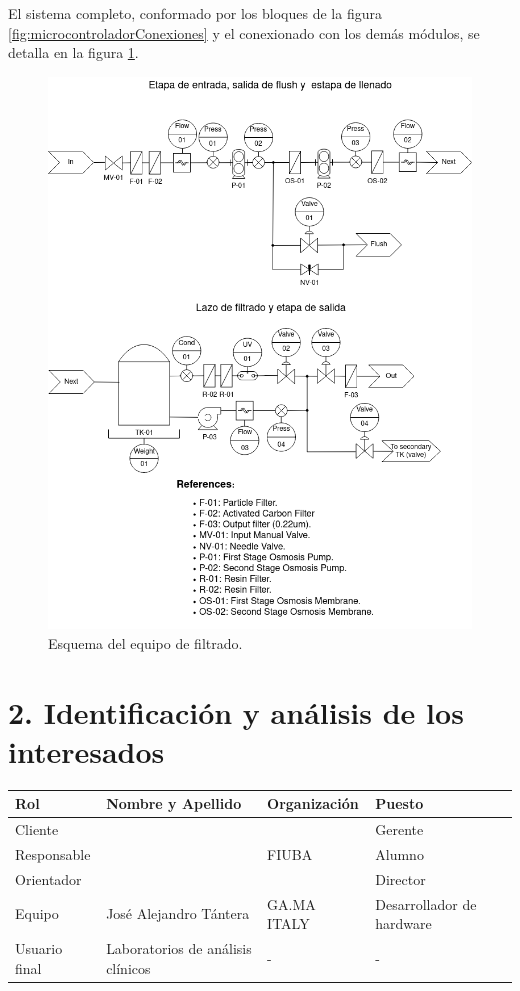 \documentclass[
11pt, %
]{charter}
\begin{document}
El sistema completo, conformado por los bloques de la figura \ref{fig:microcontroladorConexiones} y el conexionado con los demás módulos, se detalla en la figura \ref{fig:equipoEsquemaFisico}.

\vspace{25px}
\begin{figure}[htpb]
\centering 
\includegraphics[width=.8\textwidth]{./Figuras/Esquema de equipo_vert.png}
\caption{Esquema del equipo de filtrado.}
\label{fig:equipoEsquemaFisico}
\end{figure}

\vspace{25px}
\newpage
\section{2. Identificación y análisis de los interesados}
\label{sec:interesados}

\begin{table}[ht]
\begin{tabularx}{\linewidth}{@{}|l|X|X|l|@{}}
\hline
\rowcolor[HTML]{C0C0C0} 
Rol           & Nombre y Apellido 		& Organización 		& Puesto 			\\ \hline
Cliente       & \clientename 			&\empclientename 	& Gerente 			\\ \hline
Responsable   & \authorname 			& FIUBA        		& Alumno 			\\ \hline
Orientador    & \supname 				& \pertesupname 	& Director 			\\ \hline
Equipo        & José Alejandro Tántera 	& GA.MA ITALY 		& Desarrollador de hardware    	\\ \hline
Usuario final & Laboratorios de análisis clínicos           &       -       	&      -  	\\ \hline
\end{tabularx}
\end{table}
\end{document}
